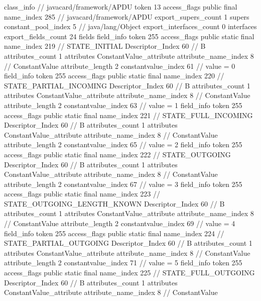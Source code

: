 {{{		}
		class_info {		// javacard/framework/APDU
			token	13
			access_flags	public final
			name_index	285		// javacard/framework/APDU
			export_supers_count	1
			supers {
				constant_pool_index	5		// java/lang/Object
			}
			export_interfaces_count	0
			interfaces {
			}
			export_fields_count	24
			fields {
			field_info {
				token	255
				access_flags	public static final
				name_index	219		// STATE_INITIAL
				Descriptor_Index	60		// B
				attributes_count	1
				attributes {
				ConstantValue_attribute {
					attribute_name_index	8		// ConstantValue
					attribute_length	2
					constantvalue_index	61		// value = 0
				}
				}
			}
			field_info {
				token	255
				access_flags	public static final
				name_index	220		// STATE_PARTIAL_INCOMING
				Descriptor_Index	60		// B
				attributes_count	1
				attributes {
				ConstantValue_attribute {
					attribute_name_index	8		// ConstantValue
					attribute_length	2
					constantvalue_index	63		// value = 1
				}
				}
			}
			field_info {
				token	255
				access_flags	public static final
				name_index	221		// STATE_FULL_INCOMING
				Descriptor_Index	60		// B
				attributes_count	1
				attributes {
				ConstantValue_attribute {
					attribute_name_index	8		// ConstantValue
					attribute_length	2
					constantvalue_index	65		// value = 2
				}
				}
			}
			field_info {
				token	255
				access_flags	public static final
				name_index	222		// STATE_OUTGOING
				Descriptor_Index	60		// B
				attributes_count	1
				attributes {
				ConstantValue_attribute {
					attribute_name_index	8		// ConstantValue
					attribute_length	2
					constantvalue_index	67		// value = 3
				}
				}
			}
			field_info {
				token	255
				access_flags	public static final
				name_index	223		// STATE_OUTGOING_LENGTH_KNOWN
				Descriptor_Index	60		// B
				attributes_count	1
				attributes {
				ConstantValue_attribute {
					attribute_name_index	8		// ConstantValue
					attribute_length	2
					constantvalue_index	69		// value = 4
				}
				}
			}
			field_info {
				token	255
				access_flags	public static final
				name_index	224		// STATE_PARTIAL_OUTGOING
				Descriptor_Index	60		// B
				attributes_count	1
				attributes {
				ConstantValue_attribute {
					attribute_name_index	8		// ConstantValue
					attribute_length	2
					constantvalue_index	71		// value = 5
				}
				}
			}
			field_info {
				token	255
				access_flags	public static final
				name_index	225		// STATE_FULL_OUTGOING
				Descriptor_Index	60		// B
				attributes_count	1
				attributes {
				ConstantValue_attribute {
					attribute_name_index	8		// ConstantValue
}}}}}}}
